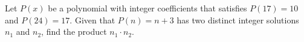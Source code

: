 Let $P(x)$ be a polynomial with integer coefficients that satisfies $P(17)=10$ and $P(24)=17$. Given that $P(n)=n+3$ has two distinct integer solutions $n_1$ and $n_2$, find the product $n_1\cdot n_2$.